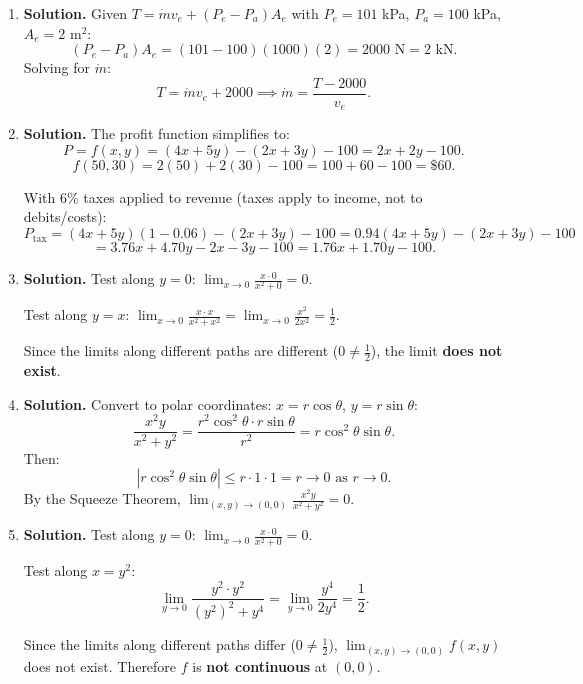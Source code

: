 \begin{enumerate}
\item \textbf{Solution.}
Given $T = \dot{m}v_e + (P_e - P_a)A_e$ with $P_e = 101$ kPa, $P_a = 100$ kPa, $A_e = 2$ m$^2$:
\[
(P_e - P_a)A_e = (101 - 100)(1000)(2) = 2000 \text{ N} = 2 \text{ kN}.
\]
Solving for $\dot{m}$:
\[
T = \dot{m}v_e + 2000 \implies \boxed{\dot{m} = \frac{T - 2000}{v_e}}.
\]

\item \textbf{Solution.}
The profit function simplifies to:
\[
P = f(x,y) = (4x + 5y) - (2x + 3y) - 100 = 2x + 2y - 100.
\]
\[
f(50,30) = 2(50) + 2(30) - 100 = 100 + 60 - 100 = \boxed{\$60}.
\]

With 6\% taxes applied to revenue (taxes apply to income, not to debits/costs):
\[
P_{\text{tax}} = (4x + 5y)(1 - 0.06) - (2x + 3y) - 100 = 0.94(4x+5y) - (2x+3y) - 100
\]
\[
= 3.76x + 4.70y - 2x - 3y - 100 = 1.76x + 1.70y - 100.
\]


\item \textbf{Solution.}
Test along $y = 0$: $\displaystyle\lim_{x \to 0} \frac{x \cdot 0}{x^2 + 0} = 0$.

Test along $y = x$: $\displaystyle\lim_{x \to 0} \frac{x \cdot x}{x^2 + x^2} = \lim_{x \to 0} \frac{x^2}{2x^2} = \frac{1}{2}$.

Since the limits along different paths are different ($0 \neq \frac{1}{2}$), the limit \textbf{does not exist}.

\item \textbf{Solution.}
Convert to polar coordinates: $x = r\cos\theta$, $y = r\sin\theta$:
\[
\frac{x^2 y}{x^2 + y^2} = \frac{r^2\cos^2\theta \cdot r\sin\theta}{r^2} = r\cos^2\theta\sin\theta.
\]
Then:
\[
|r\cos^2\theta\sin\theta| \leq r \cdot 1 \cdot 1 = r \to 0 \text{ as } r \to 0.
\]
By the Squeeze Theorem, $\boxed{\displaystyle\lim_{(x,y)\to(0,0)} \frac{x^2y}{x^2+y^2} = 0}$.

\item \textbf{Solution.}
Test along $y = 0$: $\displaystyle\lim_{x \to 0} \frac{x \cdot 0}{x^2 + 0} = 0$.

Test along $x = y^2$:
\[
\lim_{y \to 0} \frac{y^2 \cdot y^2}{(y^2)^2 + y^4} = \lim_{y \to 0} \frac{y^4}{2y^4} = \frac{1}{2}.
\]

Since the limits along different paths differ ($0 \neq \frac{1}{2}$), $\displaystyle\lim_{(x,y)\to(0,0)} f(x,y)$ does not exist. Therefore $f$ is \textbf{not continuous} at $(0,0)$.


\end{enumerate}
